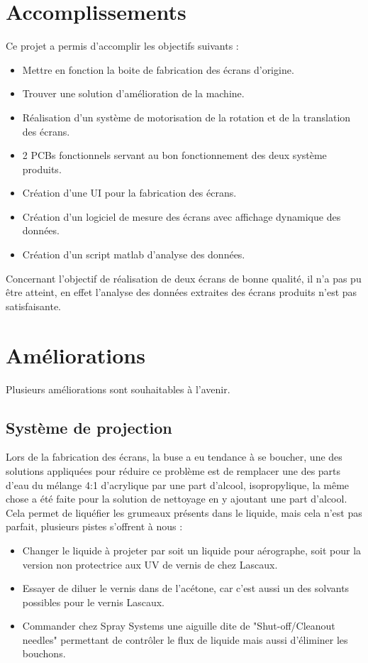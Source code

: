 \section{Accomplissements}
Ce projet a permis d'accomplir les objectifs suivants :
\begin{itemize}
    \item Mettre en fonction la boite de fabrication des écrans d'origine.
    \item Trouver une solution d'amélioration de la machine.
    \item Réalisation d'un système de motorisation de la rotation et de la translation des écrans.
    \item 2 PCBs fonctionnels servant au bon fonctionnement des deux système produits.
    \item Création d'une UI pour la fabrication des écrans.
    \item Création d'un logiciel de mesure des écrans avec affichage dynamique des données.
    \item Création d'un script matlab d'analyse des données.
\end{itemize}
Concernant l'objectif de réalisation de deux écrans de bonne qualité, il n'a pas pu être atteint, en effet l'analyse
des données extraites des écrans produits n'est pas satisfaisante.

\section{Améliorations}
Plusieurs améliorations sont souhaitables à l'avenir.
\subsection{Système de projection}
Lors de la fabrication des écrans, la buse a eu tendance à se boucher, une des solutions appliquées
pour réduire ce problème est de remplacer une des parts d'eau du mélange 4:1 d'acrylique par une part d'alcool, isopropylique,
la même chose a été faite pour la solution de nettoyage en y ajoutant une part d'alcool. Cela permet de liquéfier les grumeaux présents dans
le liquide, mais cela n'est pas parfait, plusieurs pistes s'offrent à nous :
\begin{itemize}
    \item Changer le liquide à projeter par soit un liquide pour aérographe, soit pour la version non protectrice aux UV de vernis de chez Lascaux.
    \item Essayer de diluer le vernis dans de l'acétone, car c'est aussi un des solvants possibles pour le vernis Lascaux.
    \item Commander chez Spray Systems une aiguille dite de "Shut-off/Cleanout needles" permettant de contrôler le flux de liquide mais aussi d'éliminer les bouchons.
\end{itemize}

